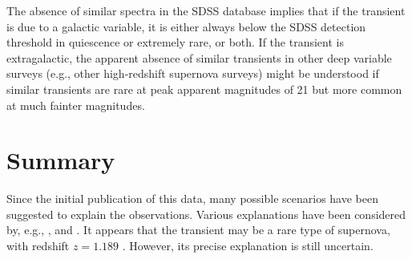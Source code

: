The absence of similar spectra in the SDSS database implies that if
the transient is due to a galactic variable, it is either always below
the SDSS detection threshold in quiescence or extremely rare, or both.
If the transient is extragalactic, the apparent absence of similar
transients in other deep variable surveys (e.g., other high-redshift
supernova surveys) might be understood if similar transients are rare
at peak apparent magnitudes of 21 but more common at much fainter
magnitudes. 

\section{Summary}

Since the initial publication of this data, many possible scenarios
have been suggested to explain the observations.  Various explanations
have been considered by, e.g., \citet{gansicke09a}, \citet{soker10a}
and \citet{chatzopoulos09a}. It appears that the transient may be a
rare type of supernova, with redshift
$z=1.189$ \citep{quimby09a,pastorello10a}. However, its precise
explanation is still uncertain.

